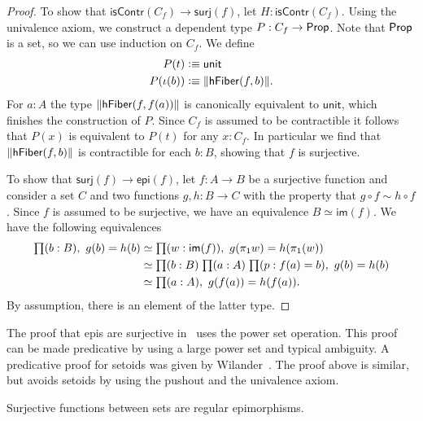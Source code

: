 \begin{proof}
To show that $\mathsf{isContr}(C_f)\to\mathsf{surj}(f)$,
let $H:\mathsf{isContr}(C_f)$. Using the univalence axiom, we construct
a dependent type $P:C_f\to\mathsf{Prop}$. Note that $\mathsf{Prop}$ is
a set, so we can use induction on $C_f$. We define
\begin{align*}
P(t) & \vcentcolon\equiv \mathsf{unit}\\
P(\iota(b)) & \vcentcolon\equiv \|\mathsf{hFiber}(f,b)\|.
\end{align*}
For $a:A$ the type $\|\mathsf{hFiber}(f,f(a))\|$ is canonically
equivalent to $\mathsf{unit}$, which finishes the construction of $P$.
Since $C_f$ is assumed to be contractible it follows that $P(x)$ is
equivalent to $P(t)$ for any $x:C_f$. In particular we find that
$\|\mathsf{hFiber}(f,b)\|$ is contractible for each $b:B$, showing
that $f$ is surjective.

To show that $\mathsf{surj}(f)\to\mathsf{epi}(f)$,
let $f:A\to B$ be a surjective function and consider a set $C$ and two functions
$g,h:B\to C$ with the property that $g\circ f\sim h\circ f$. Since $f$ 
is assumed to be surjective,
we have an equivalence $B\simeq\mathsf{im}(f)$. We have the following equivalences
\begin{align*}
\prd{b:B} g(b)= h(b) 
& \simeq \prd{w:\mathsf{im}(f)} g(\pi_1 w)= h(\pi_1(w))\\
& \simeq \prd{b:B}{a:A}{p:f(a)= b} g(b)= h(b)\\
& \simeq \prd{a:A} g(f(a))= h(f(a)).
\end{align*}
By assumption, there is an element of the latter type.
\end{proof}
The proof that epis are surjective in~\cite{Mines/R/R:1988} uses the power set operation. 
This proof can be made predicative by using a large power set and typical ambiguity.
A predicative proof for setoids was given by Wilander~\cite{Wilander2010}. 
The proof above is similar, but avoids setoids by using the pushout and the
univalence axiom. 

\begin{lem}\label{lem:images_are_coequalizers}
Surjective functions between sets are regular epimorphisms.
\end{lem}

